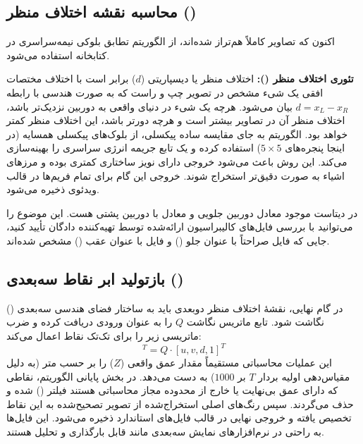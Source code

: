 \documentclass[12pt,a4paper]{article}
\begin{document}
\subsection{محاسبه نقشه اختلاف منظر ()}	اکنون که تصاویر کاملاً هم‌تراز شده‌اند، از الگوریتم تطابق بلوکی نیمه‌سراسری  در کتابخانه  استفاده می‌شود.
	
\textbf{تئوری اختلاف منظر ():} اختلاف منظر یا دیسپاریتی ($d$) برابر است با اختلاف مختصات افقی یک شیء مشخص در تصویر چپ و راست که به صورت هندسی با رابطه $d=x_L-x_R$ بیان می‌شود. هرچه یک شیء در دنیای واقعی به دوربین نزدیک‌تر باشد، اختلاف منظر آن در تصاویر بیشتر است و هرچه دورتر باشد، این اختلاف منظر کمتر خواهد بود.
	الگوریتم  به جای مقایسه ساده پیکسلی، از بلوک‌های پیکسلی همسایه (در اینجا پنجره‌های $5\times5$) استفاده کرده و یک تابع جریمه انرژی سراسری را بهینه‌سازی می‌کند. این روش باعث می‌شود خروجی دارای نویز ساختاری کمتری بوده و مرزهای اشیاء به صورت دقیق‌تر استخراج شوند. خروجی این گام برای تمام فریم‌ها در قالب ویدئوی  ذخیره می‌شود.
	
	در دیتاست موجود  معادل دوربین جلویی و  معادل با دوربین پشتی هست. این موضوع را می‌توانید با بررسی فایل‌های کالیبراسیون ارائه‌شده توسط تهیه‌کننده دادگان تأیید کنید، جایی که فایل  صراحتاً با عنوان جلو () و فایل  با عنوان عقب () مشخص شده‌اند.
	
\subsection{بازتولید ابر نقاط سه‌بعدی ()}	در گام نهایی، نقشهٔ اختلاف منظر دوبعدی باید به ساختار فضای هندسی سه‌بعدی () نگاشت شود. تابع  ماتریس نگاشت $Q$ را به عنوان ورودی دریافت کرده و ضرب ماتریسی زیر را برای تک‌تک نقاط اعمال می‌کند:
	\begin{equation}
	[X,Y,Z,W]^T=Q\cdot[u,v,d,1]^T
\end{equation}	این عملیات محاسباتی مستقیماً مقدار عمق واقعی ($Z$) را بر حسب متر (به دلیل مقیاس‌دهی اولیه بردار $T$ بر $1000$) به دست می‌دهد.
		در بخش پایانی الگوریتم، نقاطی که دارای عمق بی‌نهایت یا خارج از محدوده مجاز محاسباتی هستند فیلتر () شده و حذف می‌گردند. سپس رنگ‌های اصلی استخراج‌شده از تصویر تصحیح‌شده به این نقاط تخصیص یافته و خروجی نهایی در قالب فایل‌های استاندارد  ذخیره می‌شود. این فایل‌ها به راحتی در نرم‌افزارهای نمایش سه‌بعدی مانند  قابل بارگذاری و تحلیل هستند.
\end{document}
